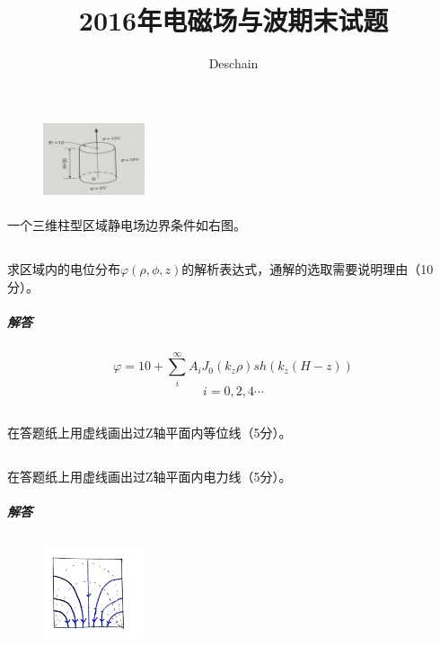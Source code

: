 \documentclass[UTF8]{ctexart}
\title{2016年电磁场与波期末试题}
\author{Deschain}
\begin{document}
\maketitle
\section{}
\begin{figure}
\includegraphics[width=3cm]{2016-1.png}
\end{figure}
\paragraph{}
一个三维柱型区域静电场边界条件如右图。
\subsection{}
\paragraph{}
求区域内的电位分布$\varphi(\rho,\phi,z)$的解析表达式，通解的选取需要说明理由（10分）。
\subparagraph{解答}
\[\varphi=10+\sum_i^{\infty}{A_iJ_0(k_z\rho)sh(k_z(H-z))}\]
\[i=0,2,4\cdots\]
\subsection{}
\paragraph{}
在答题纸上用虚线画出过Z轴平面内等位线（5分）。
\subsection{}
\paragraph{}
在答题纸上用虚线画出过Z轴平面内电力线（5分）。
\subparagraph{解答}
\begin{figure}[htbp]
\centering
\includegraphics[width=3cm,height=3cm]{2016-2.jpg}
\end{figure}
\end{document}
